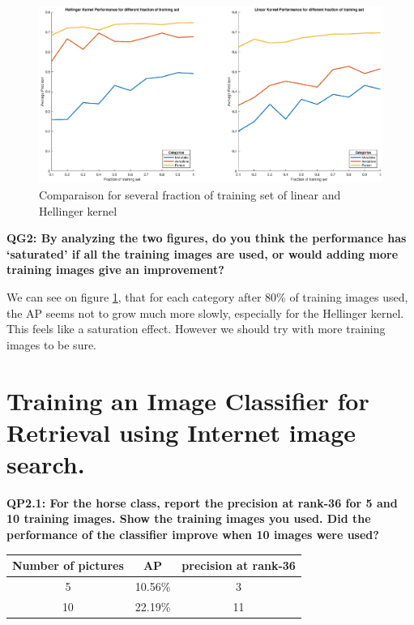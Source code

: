 \documentclass[a4paper,11pt]{exam}
\begin{document}
\begin{figure}[!h]
\centering
\includegraphics[width=15cm]{figures/training_fraction.eps}
\caption{Comparaison for several fraction of training set of linear and Hellinger kernel}    
\label{training_fraction}
\end{figure}


\textbf{QG2: By analyzing the two figures, do you think the performance has `saturated' if all the training images are used, or would adding more training images give an improvement?\\}

We can see on figure \ref{training_fraction}, that for each category after 80\% of training images used, the AP seems not to grow much more slowly, especially for the Hellinger kernel. This feels like a saturation effect. However we should try with more training images to be sure.

\clearpage


\section{Training an Image Classifier for Retrieval using Internet image search.}

\textbf{QP2.1: For the horse class, report the precision at rank-36 for 5 and 10 training images. Show the training images you used. Did the performance of the classifier improve when 10 images were used?\\}

\begin{center}
	\begin{tabular}{ c | c | c }
   		 \hline
		    Number of pictures & AP & precision at rank-36\\	
		   \hline
   		  5 & 10.56\% & 3 \\
  		  10 & 22.19\% & 11 \\
		\hline
 	\end{tabular}
\end{center}
\end{document}
